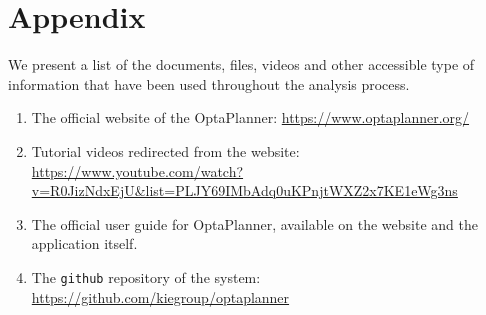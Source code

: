 \section{Appendix}
\label{sec:appendix}
We present a list of the documents, files, videos and other accessible type of information that have been used throughout the analysis process.
\begin{enumerate}[label=(\roman*)]
    \item The official website of the OptaPlanner: \url{https://www.optaplanner.org/}
    \item Tutorial videos redirected from the website:\\ \url{https://www.youtube.com/watch?v=R0JizNdxEjU&list=PLJY69IMbAdq0uKPnjtWXZ2x7KE1eWg3ns}
    \item The official user guide for OptaPlanner, available on the website and the application itself.
    \item The \verb!github! repository of the system: \url{https://github.com/kiegroup/optaplanner}
\end{enumerate}